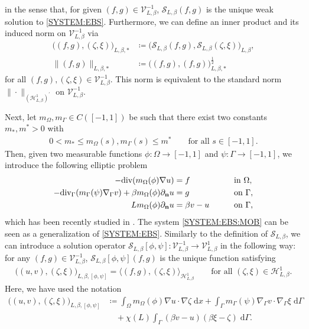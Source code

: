 \documentclass[10pt,reqno]{amsart}
\theoremstyle{remark}
\numberwithin{equation}{section}
\newcommand{\norm}[1]{\| #1 \|}
\newcommand{\n}{\mathbf{n}}
\newcommand{\intO}{\int_\Omega}
\newcommand{\intG}{\int_\Gamma}
\newcommand{\dx}{\;\mathrm{d}x}
\newcommand{\dG}{\;\mathrm d\Ga}
\newcommand{\deln}{\partial_\n}
\newcommand{\Grad}{\nabla}
\newcommand{\Div}{\textnormal{div}}
\newcommand{\Gradg}{\nabla_\Ga}
\newcommand{\Divg}{\textnormal{div}_\Ga}
\newcommand{\Om}{\Omega}
\newcommand{\Ga}{\Gamma}
\begin{document}
in the sense that, for given $(f,g)\in\mathcal{V}^{-1}_{L,\beta}$, $\mathcal{S}_{L,\beta}(f,g)$ is the unique weak solution to \eqref{SYSTEM:EBS}. Furthermore, we can define an inner product and its induced norm on $\mathcal{V}_{L,\beta}^{-1}$ via
\begin{align*}
    \big((f,g),(\zeta,\xi)\big)_{L,\beta,\ast} &\coloneqq \big(\mathcal{S}_{L,\beta}(f,g),\mathcal{S}_{L,\beta}(\zeta,\xi)\big)_{L,\beta}, \\
    \norm{(f,g)}_{L,\beta,\ast} &\coloneqq \big((f,g),(f,g)\big)_{L,\beta,\ast}^{\frac12}
\end{align*}
for all $(f,g), (\zeta,\xi)\in\mathcal{V}_{L,\beta}^{-1}$. This norm is equivalent to the standard norm $\norm{\cdot}_{(\mathcal{H}^1_{L,\beta})^\prime}$ on $\mathcal{V}^{-1}_{L,\beta}$.


Next, let $m_\Om, m_\Ga\in C([-1,1])$ be such that there exist two constants $m_\ast,m^\ast > 0$ with
\begin{align}\label{EBS:Mob:Assumptions}
    0 < m_\ast \leq m_\Om(s), m_\Ga(s) \leq m^\ast \qquad\text{for all~}s\in[-1,1].
\end{align}
Then, given two measurable functions $\phi:\Om\rightarrow[-1,1]$ and $\psi:\Ga\rightarrow[-1,1]$, we introduce the following elliptic problem
\begin{alignat}{2}\label{SYSTEM:EBS:MOB}
    -\Div(m_\Om(\phi)\Grad u) &= f &&\qquad\text{in~}\Om, \nonumber \\
    -\Divg(m_\Ga(\psi)\Gradg v) + \beta m_\Om(\phi)\deln u &= g &&\qquad\text{on~}\Ga, \\
    Lm_\Om(\phi)\deln u &= \beta v - u &&\qquad\text{on~}\Ga,\nonumber
\end{alignat}
which has been recently studied in \cite[Section~4]{Stange2025}. The system \eqref{SYSTEM:EBS:MOB} can be seen as a generalization of \eqref{SYSTEM:EBS}.
Similarly to the definition of $\mathcal{S}_{L,\beta}$, we can introduce a solution operator $\mathcal{S}_{L,\beta}[\phi,\psi]:\mathcal{V}_{L,\beta}^{-1}\rightarrow\mathcal{V}_{L,\beta}^1$ in the following way: for any $(f,g)\in\mathcal{V}_{L,\beta}^{-1}$, $\mathcal{S}_{L,\beta}[\phi,\psi](f,g)$ is the unique function satisfying
\begin{align}\label{EBS:MOB:WF}
    \big((u,v),(\zeta,\xi)\big)_{L,\beta,[\phi,\psi]} = \big\langle (f,g),(\zeta,\xi)\big\rangle_{\mathcal{H}^1_{L,\beta}}\qquad\text{for all~}(\zeta,\xi)\in\mathcal{H}^1_{L,\beta}.
\end{align}
Here, we have used the notation
\begin{align*}
    \big((u,v),(\zeta,\xi)\big)_{L,\beta,[\phi,\psi]} &\coloneqq \intO m_\Om(\phi)\Grad u\cdot\Grad\zeta\dx + \intG m_\Ga(\psi)\Gradg v\cdot\Gradg\xi\dG \\
    &\quad + \chi(L)\intG (\beta v - u)(\beta\xi - \zeta)\dG.
\end{align*}
\end{document}
